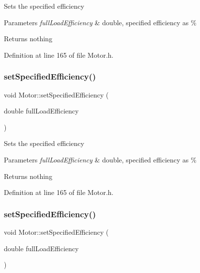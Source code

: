 Sets the specified efficiency


\begin{DoxyParams}{Parameters}
{\em full\+Load\+Efficiency} & double, specified efficiency as \%\\
\hline
\end{DoxyParams}
\begin{DoxyReturn}{Returns}
nothing 
\end{DoxyReturn}


Definition at line 165 of file Motor.\+h.

\mbox{\label{class_motor_a0a096ec5fc2b7e8ee40b4e7b30e5f337}} 
\subsubsection{\texorpdfstring{set\+Specified\+Efficiency()}{setSpecifiedEfficiency()}\hspace{0.1cm}{\footnotesize\ttfamily [2/3]}}
{\footnotesize\ttfamily void Motor\+::set\+Specified\+Efficiency (\begin{DoxyParamCaption}\item[{double}]{full\+Load\+Efficiency }\end{DoxyParamCaption})\hspace{0.3cm}{\ttfamily [inline]}}

Sets the specified efficiency


\begin{DoxyParams}{Parameters}
{\em full\+Load\+Efficiency} & double, specified efficiency as \%\\
\hline
\end{DoxyParams}
\begin{DoxyReturn}{Returns}
nothing 
\end{DoxyReturn}


Definition at line 165 of file Motor.\+h.

\mbox{\label{class_motor_a0a096ec5fc2b7e8ee40b4e7b30e5f337}} 
\subsubsection{\texorpdfstring{set\+Specified\+Efficiency()}{setSpecifiedEfficiency()}\hspace{0.1cm}{\footnotesize\ttfamily [3/3]}}
{\footnotesize\ttfamily void Motor\+::set\+Specified\+Efficiency (\begin{DoxyParamCaption}\item[{double}]{full\+Load\+Efficiency }\end{DoxyParamCaption})\hspace{0.3cm}{\ttfamily [inline]}}

